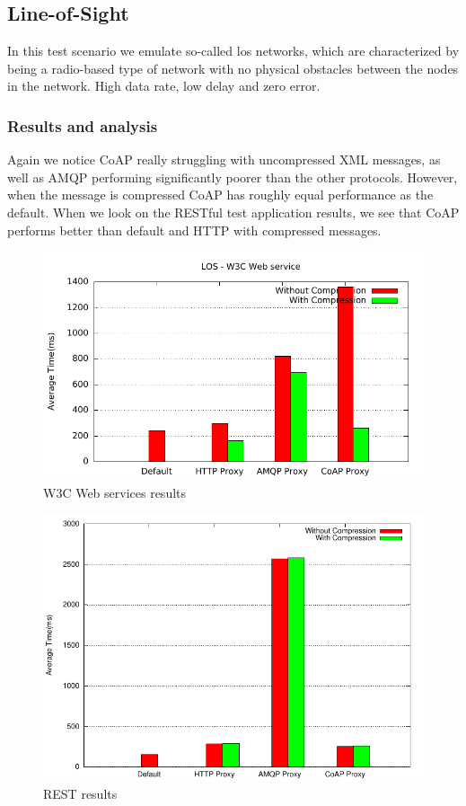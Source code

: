 \subsection{Line-of-Sight}

In this test scenario we emulate so-called \gls{los} networks, which are
characterized by being a radio-based type of network with no physical obstacles
between the nodes in the network. High data rate, low delay and zero error.

\subsubsection{Results and analysis}

Again we notice CoAP really struggling with uncompressed XML messages, as well
as AMQP performing significantly poorer than the other protocols. However,
when the message is compressed CoAP has roughly equal performance as the
default. When we look on the RESTful test application results, we see that
CoAP performs better than default and HTTP with compressed messages.

\begin{figure}[H]
\center
\includegraphics[scale=0.75]{../results/los/nffi/out.pdf}
\caption{W3C Web services results}
\end{figure}

\begin{figure}[H]
\center
\includegraphics[scale=0.75]{../results/los/rest/result.pdf}
\caption{REST results}
\end{figure}



